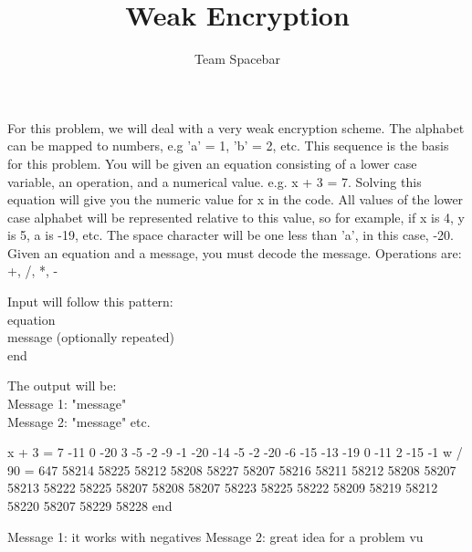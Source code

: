 \documentclass{article}
\title{Weak Encryption}
\author{Team Spacebar}
\begin{document}
\begin{problemDescription}
For this problem, we will deal with a very weak encryption scheme. The alphabet can be mapped to numbers, e.g 'a' = 1, 'b' = 2, etc. This sequence is the basis for this problem. You will be given an equation consisting of a lower case variable, an operation, and a numerical value. e.g. x + 3 = 7. Solving this equation will give you the numeric value for x in the code. All values of the lower case alphabet will be represented relative to this value, so for example, if x is 4, y is 5, a is -19, etc. The space character will be one less than 'a', in this case, -20. Given an equation and a message, you must decode the message. Operations are: +, /, *, -
\end{problemDescription}

\begin{inputDescription}
Input will follow this pattern: \\
equation\\
message (optionally repeated) \\
end
\end{inputDescription}

\begin{outputDescription}
The output will be: \\
Message 1: "message" \\
Message 2: "message" etc.
\end{outputDescription}

\begin{sampleInput}
x + 3 = 7 
-11 0 -20 3 -5 -2 -9 -1 -20 -14 -5 -2 -20 -6 -15 -13 -19 0 -11 2 -15 -1 
w / 90 = 647 
58214 58225 58212 58208 58227 58207 58216 58211 58212 58208 58207 58213 58222 58225 58207 58208 58207 58223 
58225 58222 58209 58219 58212 58220 58207 58229 58228 
end
\end{sampleInput}

\begin{sampleOutput}

Message 1: it works with negatives
Message 2: great idea for a problem vu
\end{sampleOutput}
\end{document}
